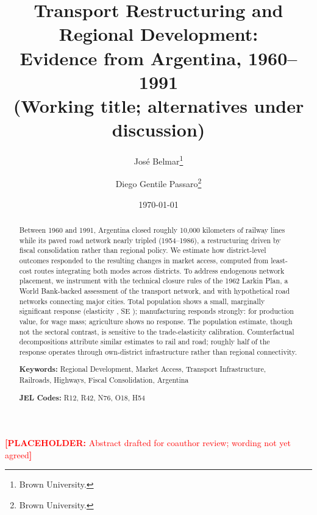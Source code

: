 \documentclass[11pt,letterpaper]{article}
\title{Transport Restructuring and Regional Development:\\
       Evidence from Argentina, 1960--1991\\[0.5em]
       \large (Working title; alternatives under discussion)}
\author{Jos\'e Belmar\thanks{Brown University.}\\[-0.2em]
        \and Diego Gentile Passaro\thanks{Brown University.}}
\date{\today}
\newcommand{\placeholder}[1]{\textcolor{red}{\textbf{[PLACEHOLDER:} #1\textbf{]}}}
\begin{document}
\maketitle

\begin{abstract}
\noindent Between 1960 and 1991, Argentina closed roughly 10{,}000
kilometers of railway lines while its paved road network nearly
tripled (1954--1986), a restructuring driven by fiscal
consolidation rather than regional policy. We estimate how district-level outcomes responded to
the resulting changes in market access, computed from least-cost
routes integrating both modes across \nDistricts{}
districts. To address endogenous network placement, we instrument with
the technical closure rules of the 1962 Larkin Plan, a World
Bank-backed assessment of the transport network, and with
hypothetical road networks connecting major cities. Total population
shows a small,
marginally significant response (elasticity \mainPopCoefIVBoth{},
SE \mainPopSEIVBoth{});
manufacturing responds strongly: \mfgValprodCoefIVBoth{} for
production value, \mfgWageMassCoefIVBoth{} for wage mass;
agriculture shows no response. The population estimate, though not the
sectoral contrast, is sensitive to the trade-elasticity calibration.
Counterfactual decompositions attribute
similar estimates to rail and road;
roughly half of the response operates through
own-district infrastructure rather than regional connectivity.
\bigskip

\noindent \textbf{Keywords:} Regional Development, Market Access,
Transport Infrastructure, Railroads, Highways, Fiscal Consolidation,
Argentina

\noindent \textbf{JEL Codes:} R12, R42, N76, O18, H54
\end{abstract}

\begin{center}
\placeholder{Abstract drafted for coauthor review; wording not yet
agreed}
\end{center}

\clearpage








\end{document}
